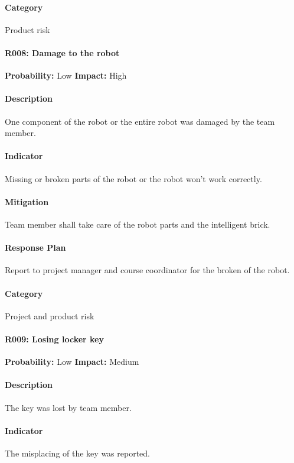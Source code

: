 \documentclass[11pt, a4paper]{report}
\begin{document}
	\paragraph{Category} Product risk
	
	\paragraph{R008: Damage to the robot} \hspace{1cm} \textbf{Probability: }Low\hspace{1cm}   \textbf{Impact: }High
	\paragraph{Description}One component of the robot or the entire robot was damaged by the team member.
	\paragraph{Indicator}Missing or broken parts of the robot or the robot won't work correctly.
	\paragraph{Mitigation}Team member shall take care of the robot parts and the intelligent brick.
	\paragraph{Response Plan}Report to project manager and course coordinator for the broken of the robot.\\
	\paragraph{Category} Project and product risk

\paragraph{R009: Losing locker key} \hspace{1cm} \textbf{Probability: }Low\hspace{1cm}   \textbf{Impact: }Medium
	\paragraph{Description}The key was lost by team member. 
	\paragraph{Indicator}The misplacing of the key was reported.
\end{document}
